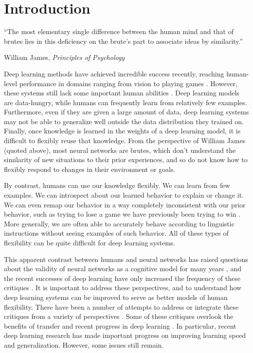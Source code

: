 \chapter{Introduction} \label{chapter:introduction}
\epigraph{``The most elementary single difference between the human mind and that of brutes lies in this deficiency on the brute's part to associate ideas by similarity.''}{William James, \textit{Principles of Psychology}}
Deep learning methods have achieved incredible success recently, reaching human-level performance in domains ranging from vision \citep[e.g.][]{Szegedy2015} to playing games \citep[e.g.][]{Silver2016}. However, these systems still lack some important human abilities \citep[e.g.][]{Lake2016}. Deep learning models are data-hungry, while humans can frequently learn from relatively few examples. Furthermore, even if they are given a large amount of data, deep learning systems may not be able to generalize well outside the data distribution they trained on. Finally, once knowledge is learned in the weights of a deep learning model, it is difficult to flexibly reuse that knowledge. From the perspective of William James (quoted above), most neural networks are brutes, which don't understand the similarity of new situations to their prior experiences, and so do not know how to flexibly respond to changes in their environment or goals. \par
By contrast, humans can use our knowledge flexibly. We can learn from few examples. We can introspect about our learned behavior to explain or change it. We can even remap our behavior in a way completely inconsistent with our prior behavior, such as trying to lose a game we have previously been trying to win \citep{Lake2016}. More generally, we are often able to accurately behave according to linguistic instructions without seeing examples of such behavior. All of these types of flexibility can be quite difficult for deep learning systems. \par 
This apparent contrast between humans and neural networks has raised questions about the validity of neural networks as a cognitive model for many years \citep[e.g.][]{Fodor1988}, and the recent successes of deep learning have only increased the frequency of these critiques \citep[e.g.][]{Lake2015, Lake2016, Lake2017, Marcus2018}. It is important to address these perspectives, and to understand how deep learning systems can be improved to serve as better models of human flexibility. There have been a number of attempts to address or integrate these critiques from a variety of perspectives \citep[e.g.][]{McClelland1999, McClelland2010, Hill2019a}. Some of these critiques overlook the benefits of transfer \citep{Lampinen2017a} and recent progress in deep learning \citep{Hansen2017}. In particular, recent deep learning research has made important progress on improving learning speed and generalization. However, some issues still remain. \par
